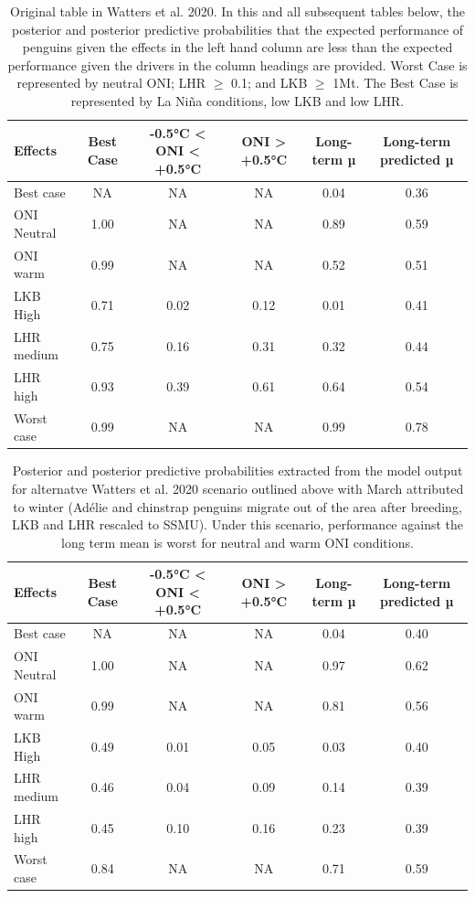 \documentclass[]{elsarticle} %
\begin{document}
\begin{landscape}

\begin{longtable}[t]{lccccc}
\caption{\label{tab:Table 1 Scenario Original}Original table in Watters et al. 2020.  In this and all subsequent tables below, the posterior and posterior predictive probabilities that the expected performance of penguins given the effects in the left hand column are less than the expected performance given the drivers in the column headings are provided. Worst Case is represented by neutral ONI; LHR  $\geqslant$ 0.1; and LKB $\geqslant$ 1Mt.  The Best Case is represented by La Niña conditions, low LKB and low LHR.}\\
\toprule
Effects & Best Case & -0.5°C < ONI < +0.5°C & ONI > +0.5°C & Long-term µ & Long-term predicted µ\\
\midrule
Best case & NA & NA & NA & 0.04 & 0.36\\
ONI Neutral & 1.00 & NA & NA & 0.89 & 0.59\\
ONI warm & 0.99 & NA & NA & 0.52 & 0.51\\
LKB High & 0.71 & 0.02 & 0.12 & 0.01 & 0.41\\
LHR medium & 0.75 & 0.16 & 0.31 & 0.32 & 0.44\\
\addlinespace
LHR high & 0.93 & 0.39 & 0.61 & 0.64 & 0.54\\
Worst case & 0.99 & NA & NA & 0.99 & 0.78\\
\bottomrule
\end{longtable}

\begin{longtable}[t]{lccccc}
\caption{\label{tab:Table 1 Scenario 37a}Posterior and posterior predictive probabilities extracted from the model output for alternatve Watters et al. 2020 scenario outlined above with March attributed to winter (Adélie and chinstrap penguins migrate out of the area after breeding, LKB and LHR rescaled to SSMU). Under this scenario, performance against the long term mean is worst for neutral and warm ONI conditions.}\\
\toprule
Effects & Best Case & -0.5°C < ONI < +0.5°C & ONI > +0.5°C & Long-term µ & Long-term predicted µ\\
\midrule
Best case & NA & NA & NA & 0.04 & 0.40\\
ONI Neutral & 1.00 & NA & NA & 0.97 & 0.62\\
ONI warm & 0.99 & NA & NA & 0.81 & 0.56\\
LKB High & 0.49 & 0.01 & 0.05 & 0.03 & 0.40\\
LHR medium & 0.46 & 0.04 & 0.09 & 0.14 & 0.39\\
\addlinespace
LHR high & 0.45 & 0.10 & 0.16 & 0.23 & 0.39\\
Worst case & 0.84 & NA & NA & 0.71 & 0.59\\
\bottomrule
\end{longtable}


\end{landscape}
\end{document}
